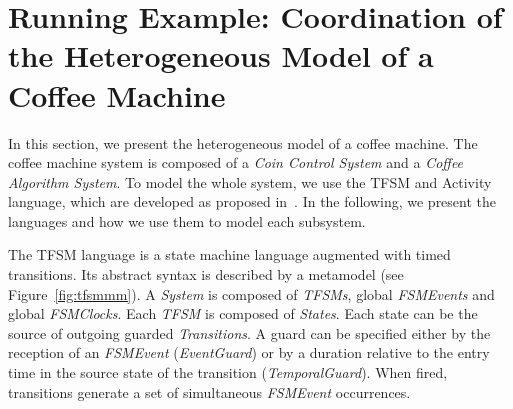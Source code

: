 \section{Running Example: Coordination of the Heterogeneous Model of a Coffee Machine}
\label{sec:runningexample}
In this section, we present the heterogeneous model of a coffee machine. The coffee machine system is composed of a \emph{Coin Control System} and a \emph{Coffee Algorithm System}. To model the whole system, we use the TFSM and Activity language, which are developed as proposed in~\cite{sle13-combemale}. In the following, we present the languages and how we use them to model each subsystem. %


The TFSM language is a state machine language augmented with timed transitions. Its abstract syntax is described by a metamodel (see Figure~\ref{fig:tfsmmm}). A \emph{System} is composed of \emph{TFSMs}, global \emph{FSMEvents} and global \emph{FSMClocks}. Each \emph{TFSM} is composed of \emph{States}. Each state can be the source of outgoing guarded \emph{Transitions}. A guard can be specified either by the reception of an \emph{FSMEvent} (\emph{EventGuard}) or by a duration relative to the entry time in the source state of the transition (\emph{TemporalGuard}). When fired, transitions generate a set of simultaneous \emph{FSMEvent} occurrences.
	
